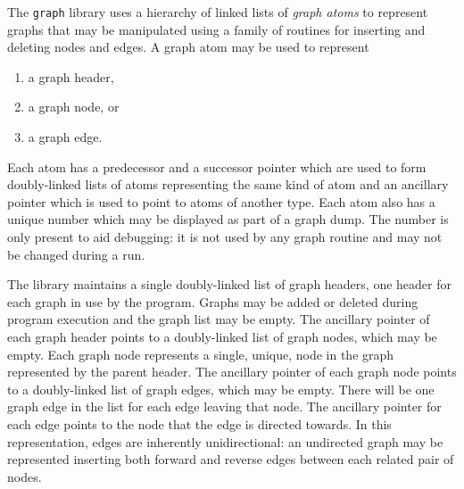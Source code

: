 The {\tt graph} library uses a hierarchy of linked lists of {\em graph atoms} to represent
graphs that may be manipulated using a family of routines for inserting and deleting nodes and
edges. 
A graph atom may be used to represent
\begin{enumerate}
\item a graph header,
\item a graph node, or
\item a graph edge.
\end{enumerate}
Each atom has a predecessor and a successor pointer which are used to form doubly-linked
lists of atoms representing the same kind of atom and an ancillary pointer which is used
to point to atoms of another type. Each atom also has a unique number which may be displayed as 
part of a graph dump. The number is only present to aid debugging: it is not used by any
graph routine and may not be changed during a run.

The library maintains a single doubly-linked list of graph headers, one
header for each graph in use by the program. Graphs may be added or deleted
during program execution and the graph list may be empty. The ancillary
pointer of each graph header points to a doubly-linked list of graph
nodes, which may be empty. Each graph node represents a single, unique,
node in the graph represented by the parent header. The ancillary
pointer of each graph node points to a doubly-linked list of graph
edges, which may be empty. There will be one graph edge in the list for
each edge leaving that node. The ancillary pointer
for each edge points to the node that the edge is directed towards. In
this representation, edges are inherently unidirectional: an undirected
graph may be represented inserting both forward and reverse edges
between each related pair of nodes.

